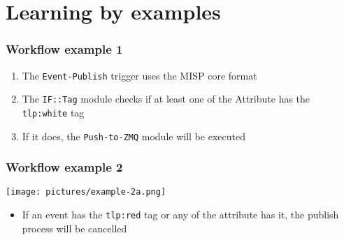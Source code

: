\section{Learning by examples}
\begin{frame}
    \frametitle{Workflow example 1}
    \begin{center}
    \end{center}

    \begin{enumerate}
        \item The \texttt{Event-Publish} trigger uses the MISP core format
        \item The \texttt{IF::Tag} module checks if at least one of the Attribute has the \texttt{tlp:white} tag
        \item If it does, the \texttt{Push-to-ZMQ} module will be executed
    \end{enumerate}
\end{frame}

\begin{frame}
    \frametitle{Workflow example 2}
    \begin{center}
        \texttt{[image: pictures/example-2a.png]}
    \end{center}

    \begin{itemize}
        \item If an event has the \texttt{tlp:red} tag or any of the attribute has it, the publish process will be cancelled
    \end{itemize}
\end{frame}


